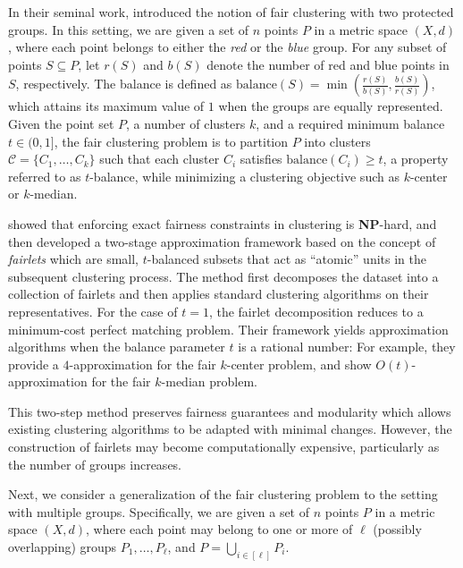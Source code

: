 In their seminal work, \citet{DBLP:conf/nips/Chierichetti0LV17} introduced the notion of fair clustering with two protected groups. In this setting, we are given a set of $n$ points $P$ in a metric space $(X, d)$, where each point belongs to either the \emph{red} or the \emph{blue} group. For any subset of points $S \subseteq P$, let $r(S)$ and $b(S)$ denote the number of red and blue points in $S$, respectively. The balance is defined as $\text{balance}(S) = \min\left( \frac{r(S)}{b(S)}, \frac{b(S)}{r(S)} \right)$, which attains its maximum value of $1$ when the groups are equally represented. Given the point set $P$, a number of clusters $k$, and a required minimum balance $t \in (0,1]$, the fair clustering problem is to partition $P$ into clusters $\mathcal{C} = \{C_1, \dots, C_k\}$ such that each cluster $C_i$ satisfies $\text{balance}(C_i) \geq t$, a property referred to as $t$-balance, while minimizing a clustering objective such as $k$-center or $k$-median.

\cite{DBLP:conf/nips/Chierichetti0LV17} showed that enforcing exact fairness constraints in clustering is {\bf NP}-hard, and then developed a two-stage approximation framework based on the concept of \emph{fairlets} which are small, $t$-balanced subsets that act as ``atomic'' units in the subsequent clustering process. 
The method first decomposes the dataset into a collection of fairlets and then applies standard clustering algorithms on their representatives. For the case of $t = 1$, the fairlet decomposition reduces to a minimum-cost perfect matching problem. Their framework yields approximation algorithms when the balance parameter $t$ is a rational number: For example, they provide a $4$-approximation for the fair $k$-center problem, and show $O(t)$-approximation for the fair $k$-median problem.

This two-step method preserves fairness guarantees and modularity which allows existing clustering algorithms to be adapted with minimal changes. However, the construction of fairlets may become computationally expensive, particularly as the number of groups increases. 

Next, we consider a generalization of the fair clustering problem to the setting with multiple groups. Specifically, we are given a set of $n$ points $P$ in a metric space $(X, d)$, where each point may belong to one or more of $\ell$ (possibly overlapping) groups $P_1, \dots, P_\ell$, and $P = \bigcup_{i \in [\ell]} P_i$.

